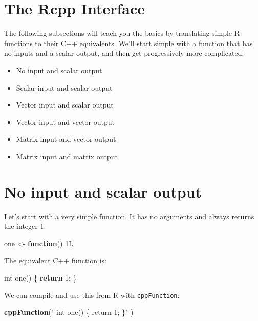 \documentclass[
]{krantz}
\newenvironment{Shaded}{\begin{snugshade}}{\end{snugshade}}
\newcommand{\ControlFlowTok}[1]{\textcolor[rgb]{0.13,0.29,0.53}{\textbf{#1}}}
\newcommand{\DataTypeTok}[1]{\textcolor[rgb]{0.13,0.29,0.53}{#1}}
\newcommand{\DecValTok}[1]{\textcolor[rgb]{0.00,0.00,0.81}{#1}}
\newcommand{\KeywordTok}[1]{\textcolor[rgb]{0.13,0.29,0.53}{\textbf{#1}}}
\newcommand{\NormalTok}[1]{#1}
\newcommand{\StringTok}[1]{\textcolor[rgb]{0.31,0.60,0.02}{#1}}
\providecommand{\tightlist}{%
  \setlength{\itemsep}{0pt}\setlength{\parskip}{0pt}}
\begin{document}
\hypertarget{the-rcpp-interface}{%
\section{The Rcpp Interface}\label{the-rcpp-interface}}

The following subsections will teach you the basics by translating simple R functions to their C++ equivalents. We'll start simple with a function that has no inputs and a scalar output, and then get progressively more complicated:

\begin{itemize}
\tightlist
\item
  No input and scalar output
\item
  Scalar input and scalar output
\item
  Vector input and scalar output
\item
  Vector input and vector output
\item
  Matrix input and vector output
\item
  Matrix input and matrix output
\end{itemize}

\hypertarget{no-input-and-scalar-output}{%
\section{No input and scalar output}\label{no-input-and-scalar-output}}

Let's start with a very simple function. It has no arguments and always returns the integer 1:

\begin{Shaded}
\begin{Highlighting}[]
\NormalTok{one \textless{}{-}}\StringTok{ }\ControlFlowTok{function}\NormalTok{() 1L}
\end{Highlighting}
\end{Shaded}

The equivalent C++ function is:

\begin{Shaded}
\begin{Highlighting}[]
\DataTypeTok{int}\NormalTok{ one() \{}
  \ControlFlowTok{return} \DecValTok{1}\NormalTok{;}
\NormalTok{\}}
\end{Highlighting}
\end{Shaded}

We can compile and use this from R with \texttt{cppFunction}:

\begin{Shaded}
\begin{Highlighting}[]
\KeywordTok{cppFunction}\NormalTok{(}\StringTok{"}
\StringTok{  int one() \{}
\StringTok{    return 1;}
\StringTok{  \}"}
\NormalTok{)}
\end{Highlighting}
\end{Shaded}
\end{document}
